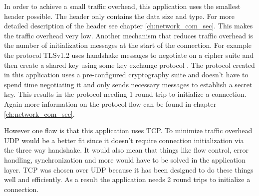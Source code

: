 In order to achieve a small traffic overhead, this application uses the smallest header possible. The header only contains the data size and type. For more detailed description of the header see chapter \ref{ch:network_com_sec}. This makes the traffic overhead very low. Another mechanism that reduces traffic overhead is the number of initialization messages at the start of the connection. For example the protocol TLSv1.2 uses handshake messages to negotiate on a cipher suite and then create a shared key using some key exchange protocol \cite{Ristic2014}. The protocol created in this application uses a pre-configured cryptography suite and doesn't have to spend time negotiating it and only sends necessary messages to establish a secret key. This results in the protocol needing 1 round trip to initialize a connection. Again more information on the protocol flow can be found in chapter \ref{ch:network_com_sec}.

However one flaw is that this application uses TCP. To minimize traffic overhead UDP would be a better fit since it doesn't require connection initialization via the three way handshake. It would also mean that things like flow control, error handling, synchronization and more would have to be solved in the application layer. TCP was chosen over UDP because it has been designed to do these things well and efficiently. As a result the application needs 2 round trips to initialize a connection.
